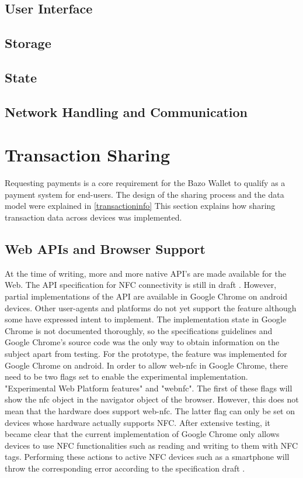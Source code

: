 \subsection{User Interface}
\subsection{Storage}
\subsection{State}
\subsection{Network Handling and Communication}

\section{Transaction Sharing}
Requesting payments is a core requirement for the Bazo Wallet to qualify as a payment system for end-users. The design of the sharing process and the data model were explained in \ref{transactioninfo} This section explains how sharing transaction data across devices was implemented.
\subsection{Web APIs and Browser Support}\label{browsersupport}
At the time of writing, more and more native API's are made available for the Web.
The API specification for NFC connectivity is still in draft \cite{webnfc}. However, partial implementations of the API are available in Google Chrome on android devices. Other user-agents and platforms do not yet support the feature although some have expressed intent to implement. The implementation state in Google Chrome is not documented thoroughly, so the specifications guidelines and Google Chrome's source code was the only way to obtain information on the subject apart from testing.
For the prototype, the feature was implemented for Google Chrome on android.
In order to allow web-nfc in Google Chrome, there need to be two flags set to enable the experimental implementation.
"Experimental Web Platform features" and "webnfc". The first of these flags will show the nfc object in the navigator object of the browser. However, this does not mean that the hardware does support web-nfc. The latter flag can only be set on devices whose hardware actually supports NFC.
After extensive testing, it became clear that the current implementation of Google Chrome only allows devices to use NFC functionalities such as reading and writing to them with NFC tags. Performing these actions to active NFC devices such as a smartphone will throw the corresponding error according to the specification draft \cite{webnfc}.


